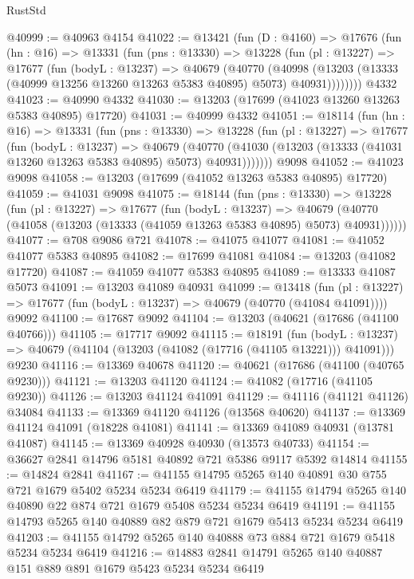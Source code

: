 \begin{lexlean}{RustStd}
\begin{coremodule}
@40999 := @40963 @4154
@41022 := @13421
    (fun (D : @4160) =>
    @17676
      (fun (hn : @16) =>
      @13331
        (fun (pns : @13330) =>
        @13228
          (fun (pl : @13227) =>
          @17677
            (fun (bodyL : @13237) =>
            @40679
              (@40770
                (@40998
                  (@13203 (@13333 (@40999 @13256 @13260 @13263 @5383 @40895) @5073) @40931))))))))
    @4332
@41023 := @40990 @4332
@41030 := @13203 (@17699 (@41023 @13260 @13263 @5383 @40895) @17720)
@41031 := @40999 @4332
@41051 := @18114
    (fun (hn : @16) =>
    @13331
      (fun (pns : @13330) =>
      @13228
        (fun (pl : @13227) =>
        @17677
          (fun (bodyL : @13237) =>
          @40679
            (@40770 (@41030 (@13203 (@13333 (@41031 @13260 @13263 @5383 @40895) @5073) @40931)))))))
    @9098
@41052 := @41023 @9098
@41058 := @13203 (@17699 (@41052 @13263 @5383 @40895) @17720)
@41059 := @41031 @9098
@41075 := @18144
    (fun (pns : @13330) =>
    @13228
      (fun (pl : @13227) =>
      @17677
        (fun (bodyL : @13237) =>
        @40679 (@40770 (@41058 (@13203 (@13333 (@41059 @13263 @5383 @40895) @5073) @40931))))))
@41077 := @708 @9086 @721
@41078 := @41075 @41077
@41081 := @41052 @41077 @5383 @40895
@41082 := @17699 @41081
@41084 := @13203 (@41082 @17720)
@41087 := @41059 @41077 @5383 @40895
@41089 := @13333 @41087 @5073
@41091 := @13203 @41089 @40931
@41099 := @13418
    (fun (pl : @13227) => @17677 (fun (bodyL : @13237) => @40679 (@40770 (@41084 @41091))))
    @9092
@41100 := @17687 @9092
@41104 := @13203 (@40621 (@17686 (@41100 @40766)))
@41105 := @17717 @9092
@41115 := @18191
    (fun (bodyL : @13237) => @40679 (@41104 (@13203 (@41082 (@17716 (@41105 @13221))) @41091)))
    @9230
@41116 := @13369 @40678
@41120 := @40621 (@17686 (@41100 (@40765 @9230)))
@41121 := @13203 @41120
@41124 := @41082 (@17716 (@41105 @9230))
@41126 := @13203 @41124 @41091
@41129 := @41116 (@41121 @41126) @34084
@41133 := @13369 @41120 @41126 (@13568 @40620)
@41137 := @13369 @41124 @41091 (@18228 @41081)
@41141 := @13369 @41089 @40931 (@13781 @41087)
@41145 := @13369 @40928 @40930 (@13573 @40733)
@41154 := @36627 @2841 @14796 @5181 @40892 @721 @5386 @9117 @5392 @14814
@41155 := @14824 @2841
@41167 := @41155 @14795 @5265 @140 @40891 @30 @755 @721 @1679 @5402 @5234 @5234 @6419
@41179 := @41155 @14794 @5265 @140 @40890 @22 @874 @721 @1679 @5408 @5234 @5234 @6419
@41191 := @41155 @14793 @5265 @140 @40889 @82 @879 @721 @1679 @5413 @5234 @5234 @6419
@41203 := @41155 @14792 @5265 @140 @40888 @73 @884 @721 @1679 @5418 @5234 @5234 @6419
@41216 := @14883 @2841 @14791 @5265 @140 @40887 @151 @889 @891 @1679 @5423 @5234 @5234 @6419

\end{coremodule}
\end{lexlean}
